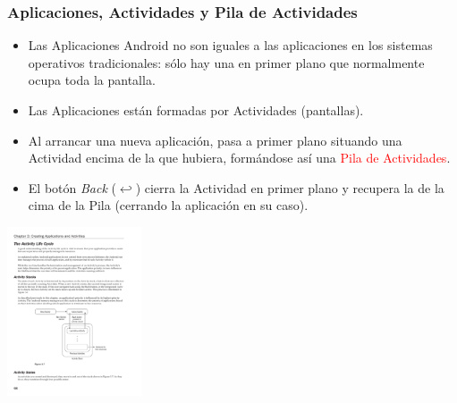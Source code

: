 \documentclass[hyperref={pdfpagelabels=true},ucs]{beamer}
\begin{document}
\begin{frame}[shrink=15]
\frametitle{Aplicaciones, Actividades y  Pila de Actividades}
  
\begin{itemize}
\item Las Aplicaciones Android no son iguales a las aplicaciones
  en los sistemas operativos tradicionales: sólo hay una en primer
  plano que normalmente ocupa toda la pantalla.
\item Las Aplicaciones están formadas por \alert{Actividades}
  (pantallas).
\item Al arrancar una nueva aplicación, pasa a primer plano situando
  una Actividad encima de la que hubiera, formándose así una
  \textcolor{red}{Pila de Actividades}.
\item El botón \emph{Back} ($\hookleftarrow$) cierra la Actividad en
  primer plano y recupera la de la cima de la Pila (cerrando la
  aplicación en su caso).
\end{itemize}

\begin{center}
  \includegraphics[height=50mm]{figs/PAAD-p68}
\end{center}



\end{frame}
\end{document}
